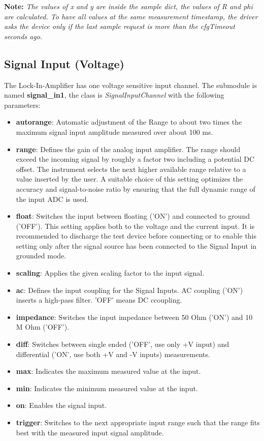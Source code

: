 \documentclass[11pt]{article} %
\begin{document}
	{\bf Note:} {\it The values of x and y are inside the sample dict, the values of R and phi are calculated. To have all values at the same measurement timestamp, the driver asks the device only if the last sample request is more than the cfgTimeout seconds ago.}


\subsection{Signal Input (Voltage)}
The Lock-In-Amplifier has one voltage sensitive input channel. The submodule is named {\bf signal\_in1}, the class is {\it SignalInputChannel} with the following parameters:
\begin{itemize}
\item {\bf autorange}: Automatic adjustment of the Range to about two times the maximum signal input amplitude measured over about 100 ms.
\item {\bf range}: Defines the gain of the analog input amplifier. The range should exceed the incoming signal by roughly a factor two including a potential DC offset. The instrument selects the next higher available range relative to a value inserted by the user. A suitable choice of this setting optimizes the accuracy and signal-to-noise ratio by ensuring that the full dynamic range of the input ADC is used.
\item {\bf float}: Switches the input between floating ('ON') and connected to ground ('OFF'). This setting applies both to the voltage and the current input. It is recommended to discharge the test device before connecting or to enable this setting only after the signal source has been connected to the Signal Input in grounded mode.
\item {\bf scaling}: Applies the given scaling factor to the input signal.
\item {\bf ac}: Defines the input coupling for the Signal Inputs. AC coupling ('ON') inserts a high-pass filter. 'OFF' means DC ccoupling.
\item {\bf impedance}: Switches the input impedance between 50 Ohm ('ON') and 10 M Ohm ('OFF').
\item {\bf diff}: Switches between single ended ('OFF', use only +V input) and differential ('ON', use both +V and -V inputs) measurements.
\item {\bf max}: Indicates the maximum measured value at the input.
\item {\bf min}: Indicates the minimum measured value at the input.
\item {\bf on}: Enables the signal input.
\item {\bf trigger}: Switches to the next appropriate input range such that the range fits best with the measured input signal amplitude.
\end{itemize}
\end{document}

